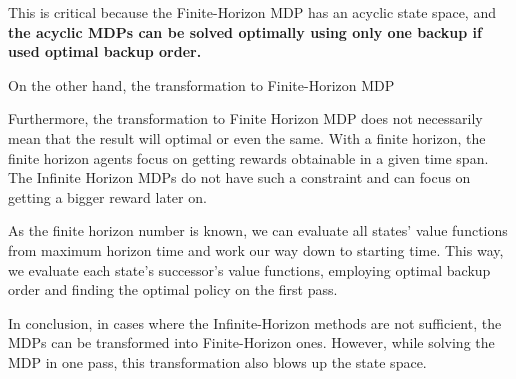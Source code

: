 This is critical because the Finite-Horizon MDP has an acyclic state space, and \textbf{the acyclic MDPs can be solved optimally using only one backup if used optimal backup order.} \cite{Kolobov2012}

 On the other hand, the transformation to Finite-Horizon MDP %

Furthermore, the transformation to Finite Horizon MDP does not necessarily mean that the result will optimal or even the same. With a finite horizon, the finite horizon agents focus on getting rewards obtainable in a given time span. The Infinite Horizon MDPs do not have such a constraint and can focus on getting a bigger reward later on.

As the finite horizon number is known, we can evaluate all states' value functions from maximum horizon time and work our way down to starting time. This way, we evaluate each state's successor's value functions, employing optimal backup order and finding the optimal policy on the first pass.

In conclusion, in cases where the Infinite-Horizon methods are not sufficient, the MDPs can be transformed into Finite-Horizon ones. However, while solving the MDP in one pass, this transformation also blows up the state space.

